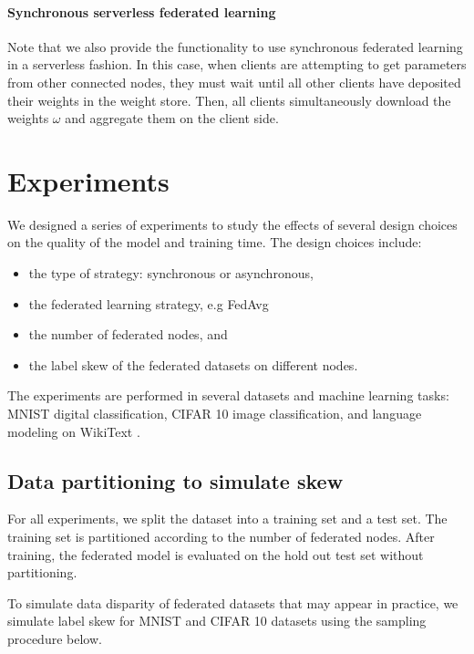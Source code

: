 \documentclass[twocolumn, switch]{article} %
\begin{document}
\paragraph{Synchronous serverless federated learning}

Note that we also provide the functionality to use synchronous federated learning in a serverless fashion. In this case, when clients are attempting to get parameters from other connected nodes, they must wait until all other clients have deposited their weights in the weight store. Then, all clients simultaneously download the weights $\omega$ and aggregate them on the client side.

\section{Experiments}

We designed a series of experiments to study the effects of several design choices on the quality of the model and training time. The design choices include:

\begin{itemize}
    \item the type of strategy: synchronous or asynchronous,
    \item the federated learning strategy, e.g FedAvg
    \item the number of federated nodes, and
    \item the label skew of the federated datasets on different nodes.
\end{itemize}

The experiments are performed in several datasets and machine learning tasks: MNIST \cite{mnist} digital classification, CIFAR 10 \cite{cifar} image classification, and language modeling on WikiText \cite{wikitext}.


\subsection{Data partitioning to simulate skew}

For all experiments, we split the dataset into a training set and a test set. The training set is partitioned according to the number of federated nodes. After training, the federated model is evaluated on the hold out test set without partitioning.

To simulate data disparity of federated datasets that may appear in practice, we simulate label skew for MNIST and CIFAR 10 datasets using the sampling procedure below. 
\end{document}
